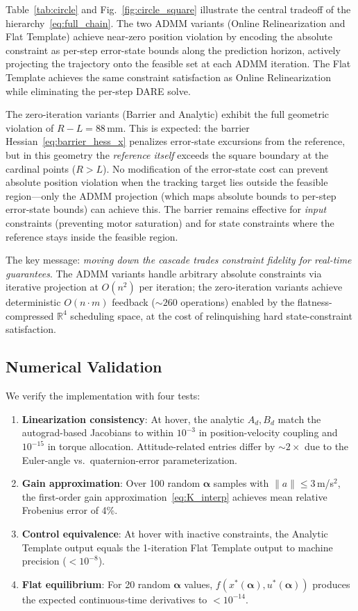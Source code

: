 \documentclass[letterpaper, 10pt, conference]{IEEEtran}
\newcommand{\R}{\mathbb{R}}
\newcommand{\balpha}{\bm{\alpha}}
\begin{document}
Table~\ref{tab:circle} and Fig.~\ref{fig:circle_square}
illustrate the central tradeoff of the
hierarchy~\eqref{eq:full_chain}.
The two ADMM variants (Online Relinearization and Flat Template)
achieve near-zero position violation by encoding the absolute
constraint as per-step error-state bounds along the prediction
horizon, actively projecting the trajectory onto the feasible
set at each ADMM iteration.
The Flat Template achieves the same constraint satisfaction
as Online Relinearization while eliminating the per-step
DARE solve.

The zero-iteration variants (Barrier and Analytic) exhibit
the full geometric violation of $R - L = 88$\,mm.
This is expected: the barrier Hessian~\eqref{eq:barrier_hess_x}
penalizes error-state excursions from the reference, but in
this geometry the \emph{reference itself} exceeds the square
boundary at the cardinal points ($R > L$).
No modification of the error-state cost can prevent absolute
position violation when the tracking target lies outside the
feasible region---only the ADMM projection (which maps
absolute bounds to per-step error-state bounds) can achieve this.
The barrier remains effective for \emph{input} constraints
(preventing motor saturation) and for state constraints where
the reference stays inside the feasible region.

The key message: \emph{moving down the cascade trades constraint
fidelity for real-time guarantees}.
The ADMM variants handle arbitrary absolute constraints via
iterative projection at $O(n^2)$ per iteration;
the zero-iteration variants achieve deterministic $O(n{\cdot}m)$
feedback (${\sim}260$ operations) enabled by the
flatness-compressed $\R^4$ scheduling space, at the cost of
relinquishing hard state-constraint satisfaction.

\subsection{Numerical Validation}

We verify the implementation with four tests:
\begin{enumerate}
  \item \textbf{Linearization consistency}: At hover,
    the analytic $A_d, B_d$ match the autograd-based Jacobians
    to within $10^{-3}$ in position-velocity coupling and
    $10^{-15}$ in torque allocation.
    Attitude-related entries differ by ${\sim}2\times$ due to
    the Euler-angle vs.\ quaternion-error parameterization.
  \item \textbf{Gain approximation}: Over 100 random $\balpha$ samples
    with $\|a\| \leq 3$\,m/s$^2$,
    the first-order gain approximation~\eqref{eq:K_interp}
    achieves mean relative Frobenius error of 4\%.
  \item \textbf{Control equivalence}: At hover with inactive
    constraints, the Analytic Template output equals
    the 1-iteration Flat Template output to machine precision
    ($< 10^{-8}$).
  \item \textbf{Flat equilibrium}: For 20 random $\balpha$ values,
    $f(x^*(\balpha), u^*(\balpha))$ produces the expected
    continuous-time derivatives to $< 10^{-14}$.
\end{enumerate}
\end{document}
